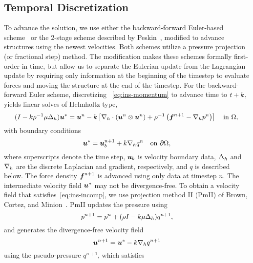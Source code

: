 

\subsection{Temporal Discretization}\label{sec:ns_time}

To advance the solution, we use either the backward-forward Euler-based scheme~\cite{Ascher:1997tm} or the 2-stage
scheme described by Peskin~\cite{Peskin:2002go}, modified to advance structures using the newest velocities. Both schemes utilize a pressure projection (or fractional step) method. The
modification makes these schemes formally first-order in time, but allow us to separate the Eulerian update from
the Lagrangian update by requiring only information at the beginning of the timestep to evaluate forces and moving
the structure at the end of the timestep. For the backward-forward Euler scheme, discretizing~%
\eqref{eq:ins-momentum} to advance time to $t+k$, yields linear solves of Helmholtz type,
\begin{equation}\label{eq:disc-momentum}
    (I - \timestep\rho^{-1}\mu \laplacian_h) \u^\ast = \u^n - \timestep\left[\div[h]\left(\u^n\otimes\u^n\right) + \rho^{-1}\left(\f^{n+1} - \grad[h]p^n\right)\right] \quad\text{in}~\domain, \\
\end{equation}
with boundary conditions
\begin{equation}\label{eq:disc-bdy}
    \u^\ast = \u^{n+1}_b + \timestep \grad[h] q^{n} \quad\text{on}~\partial\domain,
\end{equation}
where superscripts denote the time step, $\boldsymbol{u}_b$ is velocity boundary data, $\Delta_h$ and $\grad[h]$ are the
discrete Laplacian and gradient, respectively, and $q$ is described below. The force density $\boldsymbol{f}^{n+1}$ is
advanced using only data at timestep $n$. The intermediate velocity field $\boldsymbol{u}^\ast$ may not be divergence-free. To
obtain a velocity field that satisfies~\eqref{eq:ins-incomp}, we use projection method II (PmII) of Brown, Cortez,
and Minion~\cite{Brown:2001bq}. PmII updates the pressure using
\begin{equation}
    p^{n+1} = p^n + (\rho I - k\mu\Delta_h)q^{n+1},
\end{equation}
and generates the divergence-free velocity field
\begin{equation}\label{eq:vel-update}
    \u^{n+1} = \u^\ast - \timestep\grad[h]q^{n+1}
\end{equation}
using the pseudo-pressure $q^{n+1}$, which satisfies
